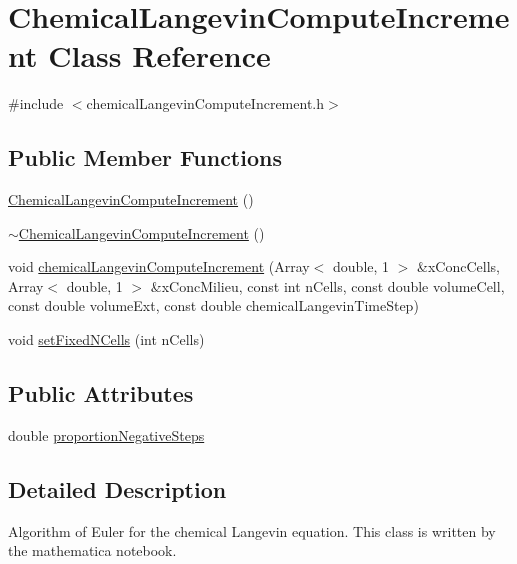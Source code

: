 \hypertarget{class_chemical_langevin_compute_increment}{\section{\-Chemical\-Langevin\-Compute\-Increment \-Class \-Reference}
\label{class_chemical_langevin_compute_increment}
}


{\ttfamily \#include $<$chemical\-Langevin\-Compute\-Increment.\-h$>$}

\subsection*{\-Public \-Member \-Functions}
\begin{DoxyCompactItemize}
\item 
\hyperlink{class_chemical_langevin_compute_increment_ae4679c9ad8ad9953805d66e4871e9361}{\-Chemical\-Langevin\-Compute\-Increment} ()
\item 
\hyperlink{class_chemical_langevin_compute_increment_a1ac92e6c10f34590984441b1df412cf6}{$\sim$\-Chemical\-Langevin\-Compute\-Increment} ()
\item 
void \hyperlink{class_chemical_langevin_compute_increment_a13e57a5e40806aba48ed89727d533736}{chemical\-Langevin\-Compute\-Increment} (\-Array$<$ double, 1 $>$ \&x\-Conc\-Cells, \-Array$<$ double, 1 $>$ \&x\-Conc\-Milieu, const int n\-Cells, const double volume\-Cell, const double volume\-Ext, const double chemical\-Langevin\-Time\-Step)
\item 
void \hyperlink{class_chemical_langevin_compute_increment_ae3578fa7650221fecd5145cee45c0b00}{set\-Fixed\-N\-Cells} (int n\-Cells)
\end{DoxyCompactItemize}
\subsection*{\-Public \-Attributes}
\begin{DoxyCompactItemize}
\item 
double \hyperlink{class_chemical_langevin_compute_increment_aebc8634943805505fba3d5a5dac51945}{proportion\-Negative\-Steps}
\end{DoxyCompactItemize}


\subsection{\-Detailed \-Description}
\-Algorithm of \-Euler for the chemical \-Langevin equation. \-This class is written by the mathematica notebook. 

